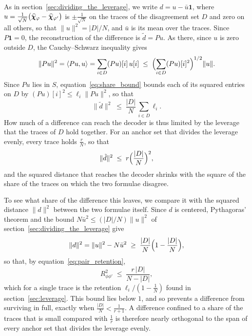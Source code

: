 \documentclass[titlepage,a4paper,11pt]{report}
\begin{document}
    As in section~\ref{sec:dividing_the_leverage}, we write $d=u-\bar u\mathbf{1}$, where $u=\frac{1}{\sqrt N}\bigl(\bm{\widehat\chi}_\varphi-\bm{\widehat\chi}_{\varphi'}\bigr)$ is $\pm\frac{1}{\sqrt N}$ on the traces of the disagreement set $D$ and zero on all others, so that $\lVert u\rVert^2=|D|/N$, and $\bar u$ is its mean over the traces. Since $P\mathbf{1}=0$, the reconstruction of the difference is $\tilde d=Pu$. As there, since $u$ is zero outside $D$, the Cauchy--Schwarz inequality gives
    \begin{equation*}
        \lVert Pu\rVert^2=\langle Pu,u\rangle=\sum_{i\in D}(Pu)[i]\,u[i]\;\le\;\Bigl(\sum_{i\in D}(Pu)[i]^2\Bigr)^{1/2}\lVert u\rVert .
    \end{equation*}
    Since $Pu$ lies in $S$, equation~\eqref{eq:share_bound} bounds each of its squared entries on $D$ by $(Pu)[i]^2\le\ell_i\lVert Pu\rVert^2$, so that
    \begin{equation}\label{eq:retention_by_leverage}
        \lVert\tilde d\rVert^2\;\le\;\frac{|D|}{N}\,\sum_{i\in D}\ell_i .
    \end{equation}
    How much of a difference can reach the decoder is thus limited by the leverage that the traces of $D$ hold together. For an anchor set that divides the leverage evenly, every trace holds $\frac rN$, so that
    \begin{equation}\label{eq:surviving_length_even}
        \lVert\tilde d\rVert^2\;\le\;r\Bigl(\frac{|D|}{N}\Bigr)^2 ,
    \end{equation}
    and the squared distance that reaches the decoder shrinks with the square of the share of the traces on which the two formulae disagree.

    To see what share of the difference this leaves, we compare it with the squared distance $\lVert d\rVert^2$ between the two formulae itself. Since $d$ is centered, Pythagoras' theorem and the bound $N\bar u^2\le(|D|/N)\lVert u\rVert^2$ of section~\ref{sec:dividing_the_leverage} give
    \begin{equation*}
        \lVert d\rVert^2=\lVert u\rVert^2-N\bar u^2\;\ge\;\frac{|D|}{N}\Bigl(1-\frac{|D|}{N}\Bigr),
    \end{equation*}
    so that, by equation~\eqref{eq:pair_retention},
    \begin{equation}\label{eq:retention_even_division}
        R^2_{\phi\phi'}\;\le\;\frac{r\,|D|}{N-|D|},
    \end{equation}
    which for a single trace is the retention $\ell_i/(1-\frac1N)$ found in section~\ref{sec:leverage}. This bound lies below $1$, and so prevents a difference from surviving in full, exactly when $\frac{|D|}{N}<\frac{1}{r+1}$. A difference confined to a share of the traces that is small compared with $\frac1r$ is therefore nearly orthogonal to the span of every anchor set that divides the leverage evenly.
 
\end{document}
